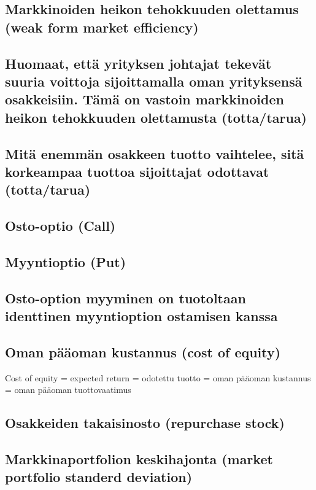 \documentclass[a4paper]{article}
\begin{document}
\subsection{Markkinoiden heikon tehokkuuden olettamus (weak form market efficiency)}

\subsection{Huomaat, että yrityksen johtajat tekevät suuria voittoja sijoittamalla oman yrityksensä osakkeisiin. Tämä on vastoin markkinoiden heikon tehokkuuden olettamusta (totta/tarua)}

\subsection{Mitä enemmän osakkeen tuotto vaihtelee, sitä korkeampaa tuottoa sijoittajat odottavat (totta/tarua)}

\subsection{Osto-optio (Call)}

\subsection{Myyntioptio (Put)}

\subsection{Osto-option myyminen on tuotoltaan identtinen myyntioption ostamisen kanssa}

\subsection{Oman pääoman kustannus (cost of equity)}

Cost of equity = expected return = odotettu tuotto = oman pääoman kustannus = oman pääoman tuottovaatimus

\subsection{Osakkeiden takaisinosto (repurchase stock)}

\subsection{Markkinaportfolion keskihajonta (market portfolio standerd deviation)}
\end{document}
